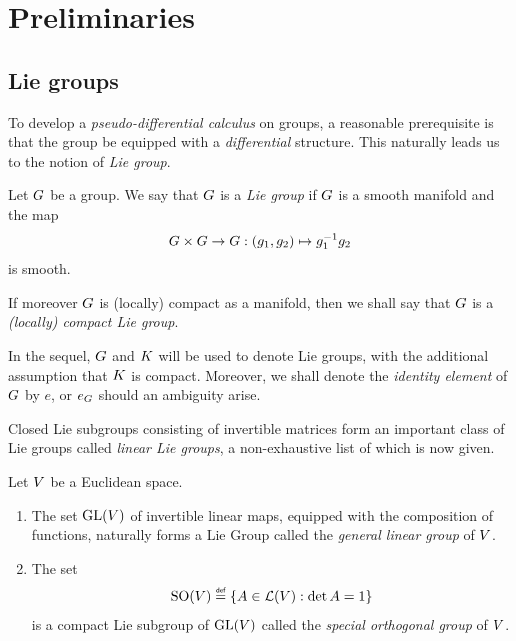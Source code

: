 \chapter{Preliminaries}

\section{Lie groups}

To develop a \emph{pseudo-differential calculus} on groups,
a reasonable prerequisite is that the group be equipped with a \emph{differential} structure.
This naturally leads us to the notion of \emph{Lie group}.

\begin{definition}
\label{definition:Lie_group}
    Let $G$ be a group.
    We say that $G$ is a \emph{Lie group}
    if $G$ is a smooth manifold and the map
    \begin{align*}
        G \times G \to G :
        (g_1, g_2) \mapsto g_1^{-1} g_2
    \end{align*}
    is smooth.

    If moreover $G$ is (locally) compact as a manifold,
    then we shall say that $G$ is a \emph{(locally) compact Lie group}.
\end{definition}

In the sequel,
$G$ and $K$ will be used to denote Lie groups,
with the additional assumption that $K$ is compact.
Moreover, we shall denote the \emph{identity element} of $G$ by $e$,
or $e_G$ should an ambiguity arise.

Closed Lie subgroups consisting of invertible matrices form an important class of Lie groups called \emph{linear Lie groups},
a non-exhaustive list of which is now given.

\begin{example}
    Let $V$ be a Euclidean space.
    \begin{enumerate}
        \item The set $\mathrm{GL}(V)$ of invertible linear maps,
            equipped with the composition of functions,
            naturally forms a Lie Group called the \emph{general linear group} of $V$.
        \item The set
            \begin{align*}
                \SpecialOrthogonalGroup \VectorSpace
                \defeq
                \{ A \in \Lin{\VectorSpace} : \det A = 1 \}
            \end{align*}
            is a compact Lie subgroup of $\mathrm{GL}(V)$
            called the \emph{special orthogonal group} of $V$.
    \end{enumerate}
\end{example}

